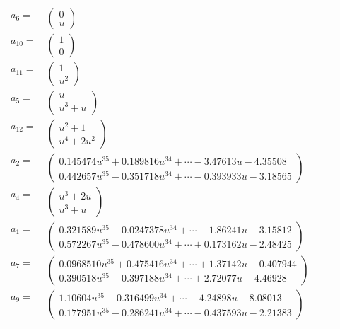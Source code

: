 \documentclass[1p]{elsarticle_modified}
\theoremstyle{definition}
\begin{document}
\begin{tabular}{m{7pt} m{180pt} m{7pt} m{180pt} }
\flushright $a_{6}=$&$\begin{pmatrix}0\\u\end{pmatrix}$ \\
\flushright $a_{10}=$&$\begin{pmatrix}1\\0\end{pmatrix}$ \\
\flushright $a_{11}=$&$\begin{pmatrix}1\\u^2\end{pmatrix}$ \\
\flushright $a_{5}=$&$\begin{pmatrix}u\\u^3+u\end{pmatrix}$ \\
\flushright $a_{12}=$&$\begin{pmatrix}u^2+1\\u^4+2 u^2\end{pmatrix}$ \\
\flushright $a_{2}=$&$\begin{pmatrix}0.145474 u^{35}+0.189816 u^{34}+\cdots-3.47613 u-4.35508\\0.442657 u^{35}-0.351718 u^{34}+\cdots-0.393933 u-3.18565\end{pmatrix}$ \\
\flushright $a_{4}=$&$\begin{pmatrix}u^3+2 u\\u^3+u\end{pmatrix}$ \\
\flushright $a_{1}=$&$\begin{pmatrix}0.321589 u^{35}-0.0247378 u^{34}+\cdots-1.86241 u-3.15812\\0.572267 u^{35}-0.478600 u^{34}+\cdots+0.173162 u-2.48425\end{pmatrix}$ \\
\flushright $a_{7}=$&$\begin{pmatrix}0.0968510 u^{35}+0.475416 u^{34}+\cdots+1.37142 u-0.407944\\0.390518 u^{35}-0.397188 u^{34}+\cdots+2.72077 u-4.46928\end{pmatrix}$ \\
\flushright $a_{9}=$&$\begin{pmatrix}1.10604 u^{35}-0.316499 u^{34}+\cdots-4.24898 u-8.08013\\0.177951 u^{35}-0.286241 u^{34}+\cdots-0.437593 u-2.21383\end{pmatrix}$ \\

\end{tabular}
\end{document}
